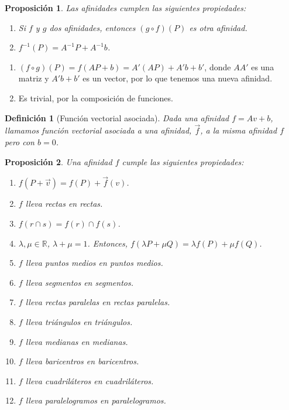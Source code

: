 \documentclass[11pt, a4paper]{article}
\makeatletter
\newif\IfInSansMode
\let\oldsf\sffamily
\renewcommand*{\sffamily}{\oldsf\mathversion{sans}\InSansModetrue}
\let\oldnorm\normalfont
\renewcommand*{\normalfont}{\oldnorm\InSansModefalse\mathversion{normal}}
\renewenvironment{proof}[1][\proofname] {\vspace{-15pt}\par\pushQED{\qed}\normalfont\topsep6\p@\@plus6\p@\relax\trivlist\item[\hskip\labelsep\it#1\@addpunct{.}]\ignorespaces}{\popQED\endtrivlist\@endpefalse}
\newcommand{\R}{\mathbb{R}}
\renewcommand{\vec}{\overrightarrow}
\renewenvironment{proof}[1][\proofname] {\par\pushQED{\qed}\normalfont\topsep6\p@\@plus6\p@\relax\trivlist\item[\hskip\labelsep\itshape\sffamily#1\@addpunct{.}]\ignorespaces}{\popQED\endtrivlist\@endpefalse}
\theoremstyle{theorem-style}
\newtheorem{nprop}{Proposición}[section]
\theoremstyle{definition-style}
\newtheorem{ndef}{Definición}[section]
\theoremstyle{remark-style}
\theoremstyle{example-style}
\newenvironment{nlist}
{\begin{enumerate}
    \renewcommand\labelenumi{(\emph{\roman{enumi})}}}
  {\end{enumerate}}
\makeatother
\begin{document}
\begin{nprop}
  Las afinidades cumplen las siguientes propiedades:
  \begin{nlist}
    \item Si $f$ y $g$ dos afinidades, entonces $(g \circ f) (P)$ es otra afinidad.
    \item $f^{-1}(P) = A^{-1}P +A^{-1}b$.
  \end{nlist}
\end{nprop}
\begin{proof}\hfill
  \begin{nlist}
  \item $(f\circ g)(P) = f(AP +b) = A'(AP)+A'b +b' $, donde $AA'$ es una matriz y $A'b+b'$ es un vector, por lo que tenemos una nueva afinidad.
  \item Es trivial, por la composición de funciones.
  \end{nlist}
\end{proof}

\begin{ndef}[Función vectorial asociada]
  Dada una afinidad $f = Av + b$, llamamos función vectorial asociada a una afinidad, $\vec{f}$, a la misma afinidad $f$ pero con $b = 0$. 
\end{ndef}

\begin{nprop}
Una afinidad $f$ cumple las siguientes propiedades:
  \begin{nlist}
    \item $f(P + \vec{v}) = f(P) + \vec{f}(v)$.
\item $f$ lleva rectas en rectas.
\item $f(r\cap s) = f(r) \cap f(s)$.
\item $\lambda,\mu \in \R$, $\lambda+\mu=1$. Entonces, $f(\lambda P + \mu Q) = \lambda f(P) +  \mu f(Q)$.
\item $f$ lleva puntos medios en puntos medios.
\item $f$ lleva segmentos en segmentos.
\item $f$ lleva rectas paralelas en rectas paralelas.
\item $f$ lleva triángulos en triángulos.
\item $f$ lleva medianas en medianas.
\item $f$ lleva baricentros en baricentros.
\item $f$ lleva cuadriláteros en cuadriláteros.
\item $f$ lleva paralelogramos en paralelogramos.
  \end{nlist}
\end{nprop}
\end{document}
